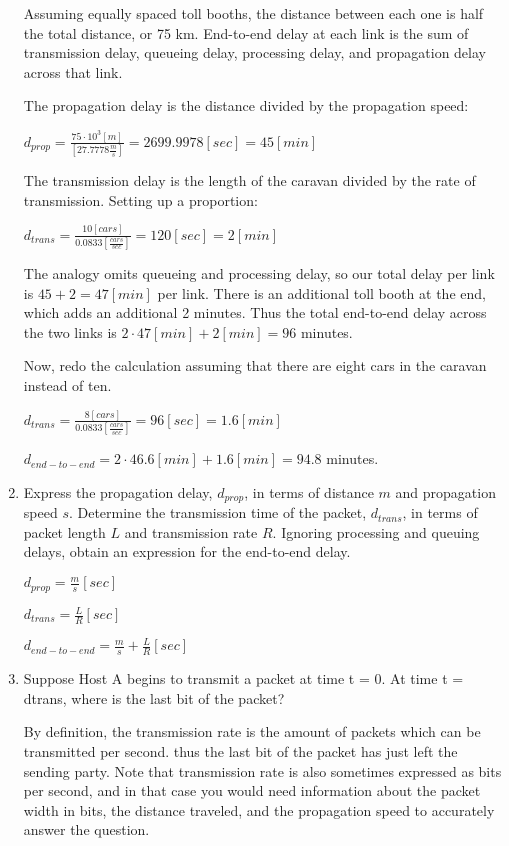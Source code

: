 \documentclass[10pt]{article}
\begin{document}
\begin{enumerate}
    Assuming equally spaced toll booths, the distance between each one is half the total distance, or 75 km.  End-to-end delay at each link is the sum of transmission delay, queueing delay, processing delay, and propagation delay across that link.
    
    The propagation delay is the distance divided by the propagation speed:
    
    $d_{prop} = \frac{75\cdot 10^3 [m]}{[27.7778 \frac{m}{s}]} = 2699.9978 [sec] = 45 [min]$

    The transmission delay is the length of the caravan divided by the rate of transmission.  Setting up a proportion:
    
    $d_{trans} = \frac{10[cars]}{0.0833 [\frac{cars}{sec}]} = 120 [sec] = 2 [min]$
    
    The analogy omits queueing and processing delay, so our total delay per link is $45 + 2 = 47 [min]$ per link.  There is an additional toll booth at the end, which adds an additional 2 minutes.  Thus the total end-to-end delay across the two links is $2\cdot 47[min] + 2 [min] = 96$ minutes.
    
    Now, redo the calculation assuming that there are eight cars in the caravan instead of ten.
    
    $d_{trans} = \frac{8[cars]}{0.0833 [\frac{cars}{sec}]} = 96 [sec] = 1.6 [min]$
    
    $d_{end-to-end} = 2 \cdot 46.6 [min] + 1.6 [min] = 94.8$ minutes.
    
    \item Express the propagation delay, $d_{prop}$, in terms of distance $m$ and propagation speed $s$.  Determine the transmission time of the packet, $d_{trans}$, in terms of packet length $L$ and transmission rate $R$.  Ignoring processing and queuing delays, obtain an expression for the end-to-end delay.

    
    $d_{prop} = \frac{m}{s}[sec]$
    
    $d_{trans} = \frac{L}{R}[sec]$
    
    $d_{end-to-end} = \frac{m}{s} + \frac{L}{R} [sec]$
    
    \item Suppose Host A begins to transmit a packet at time t = 0. At time t = dtrans, where is the last bit of the packet?
    
    By definition, the transmission rate is the amount of packets which can be transmitted per second.  thus the last bit of the packet has just left the sending party.  Note that transmission rate is also sometimes expressed as bits per second, and in that case you would need information about the packet width in bits, the distance traveled, and the propagation speed to accurately answer the question.
    

\end{enumerate}
\end{document}
